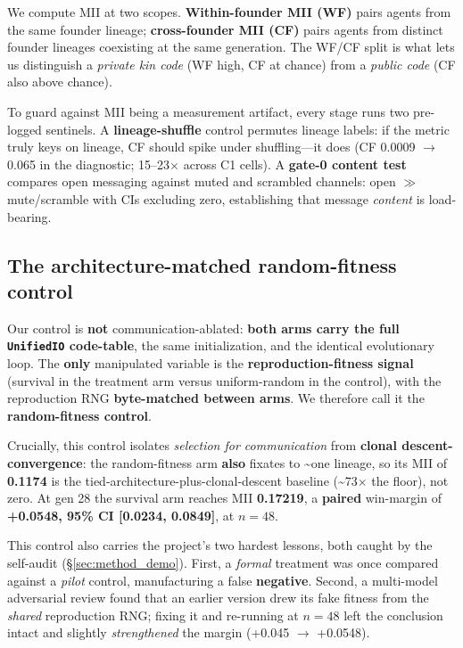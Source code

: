 \documentclass[12pt,letterpaper]{article}
\begin{document}
We compute MII at two scopes. \textbf{Within-founder MII (WF)} pairs agents from the same
founder lineage; \textbf{cross-founder MII (CF)} pairs agents from distinct founder
lineages coexisting at the same generation. The WF/CF split is what lets us distinguish a
\emph{private kin code} (WF high, CF at chance) from a \emph{public code} (CF also above
chance).

To guard against MII being a measurement artifact, every stage runs two pre-logged sentinels.
A \textbf{lineage-shuffle} control permutes lineage labels: if the metric truly keys on
lineage, CF should spike under shuffling---it does (CF 0.0009 $\to$ 0.065 in the
diagnostic; 15--23$\times$ across C1 cells). A \textbf{gate-0 content test} compares open
messaging against muted and scrambled channels: open $\gg$ mute/scramble with CIs excluding
zero, establishing that message \emph{content} is load-bearing.

\subsection{The architecture-matched random-fitness control}

Our control is \textbf{not} communication-ablated: \textbf{both arms carry the full
\texttt{UnifiedIO} code-table}, the same initialization, and the identical evolutionary
loop. The \textbf{only} manipulated variable is the \textbf{reproduction-fitness
signal} (survival in the treatment arm versus uniform-random in the control), with the
reproduction RNG \textbf{byte-matched between arms}. We therefore call it the
\textbf{random-fitness control}.

Crucially, this control isolates \emph{selection for communication} from \textbf{clonal
descent-convergence}: the random-fitness arm \textbf{also} fixates to \textasciitilde{}one
lineage, so its MII of \textbf{0.1174} is the tied-architecture-plus-clonal-descent
baseline (\textasciitilde{}73$\times$ the floor), not zero. At gen 28 the survival arm
reaches MII \textbf{0.17219}, a \textbf{paired} win-margin of
\textbf{+0.0548, 95\% CI [0.0234, 0.0849]}, at $n{=}48$.

This control also carries the project's two hardest lessons, both caught by the self-audit
(\S\ref{sec:method_demo}). First, a \emph{formal} treatment was once compared against a
\emph{pilot} control, manufacturing a false \textbf{negative}. Second, a multi-model
adversarial review found that an earlier version drew its fake fitness from the \emph{shared}
reproduction RNG; fixing it and re-running at $n{=}48$ left the conclusion intact and
slightly \emph{strengthened} the margin (+0.045 $\to$ +0.0548).
\end{document}
